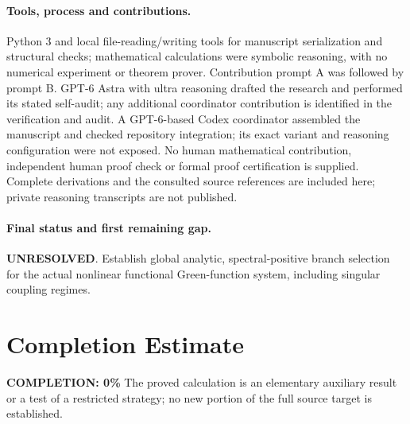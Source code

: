 \documentclass[11pt]{article}
\begin{document}
\paragraph{Tools, process and contributions.}
Python 3 and local file-reading/writing tools for manuscript serialization and structural checks; mathematical calculations were symbolic reasoning, with no numerical experiment or theorem prover. Contribution prompt A was followed by prompt B. GPT-6 Astra with ultra reasoning drafted the research and performed its stated self-audit; any additional coordinator contribution is identified in the verification and audit. A GPT-6-based Codex coordinator assembled the manuscript and checked repository integration; its exact variant and reasoning configuration were not exposed. No human mathematical contribution, independent human proof check or formal proof certification is supplied. Complete derivations and the consulted source references are included here; private reasoning transcripts are not published.

\paragraph{Final status and first remaining gap.}
\textbf{UNRESOLVED}. Establish global analytic, spectral-positive branch selection for the actual nonlinear functional Green-function system, including singular coupling regimes.

\section{Completion Estimate}
\noindent\textbf{COMPLETION: 0\%}
The proved calculation is an elementary auxiliary result or a test of a restricted strategy; no new portion of the full source target is established.
\end{document}
